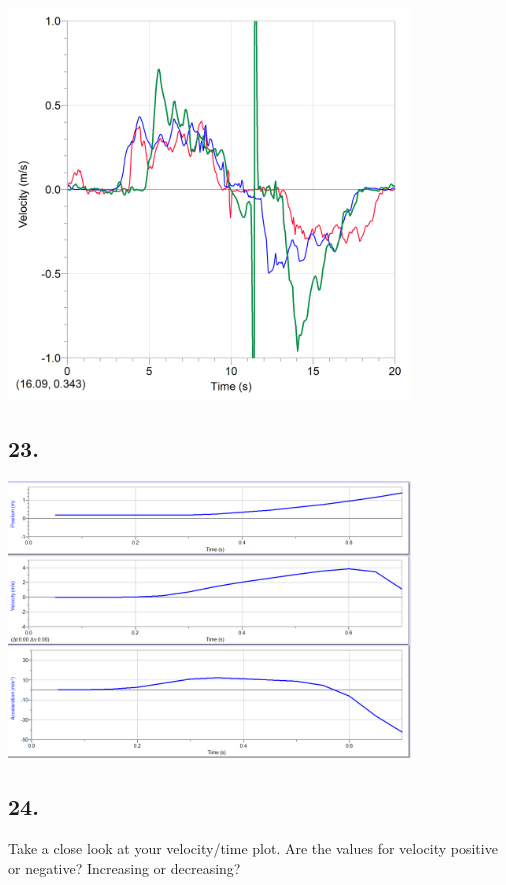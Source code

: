     \begin{mdframed}
        \centering\includegraphics[width=0.8\textwidth]{image19.png}
    \end{mdframed}

    \subsection*{23.}

    \begin{mdframed}
        \centering\includegraphics[width=0.8\textwidth]{image8.png}
    \end{mdframed}

    \pagebreak

    \subsection*{24.}
    Take a close look at your velocity/time plot. Are the values for velocity positive or negative? Increasing or decreasing?

